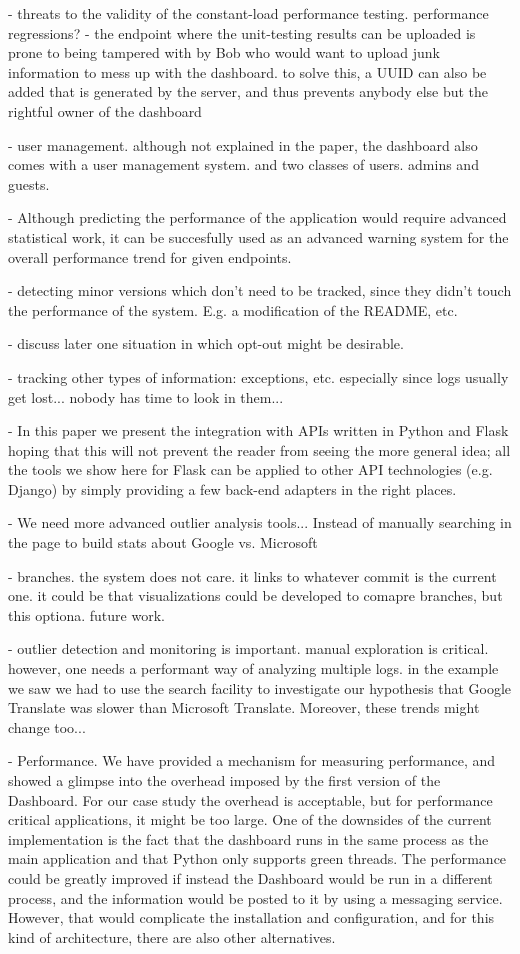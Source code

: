 - threats to the validity of the constant-load performance testing. performance regressions? 
- the endpoint where the unit-testing results can be uploaded is prone to being tampered with by Bob who would want to upload junk information to mess up with the dashboard. to solve this, a UUID can also be added that is generated by the server, and thus prevents anybody else but the rightful owner of the dashboard 

- user management. although not explained in the paper, the dashboard also comes with a user management system. and two classes of users. admins and guests.

- Although predicting the performance of the application would require advanced statistical work, it can be succesfully used as an advanced warning system for the overall performance trend for given endpoints.

- detecting minor versions which don't need to be tracked, since they didn't touch the performance of the system. E.g. a modification of the README, etc. 

- discuss later one situation in which opt-out might be desirable. 

- tracking other types of information: exceptions, etc. especially since logs usually get lost... nobody has time to look in them...

-  In this paper we present the integration with APIs written in Python and Flask hoping that this will not prevent the reader from seeing the more general idea; all the tools we show here for Flask can be applied to other API technologies (e.g. Django) by simply providing a few back-end adapters in the right places.

- We need more advanced outlier analysis tools... Instead of manually searching in the page to build stats about Google vs. Microsoft

- branches. the system does not care. it links to whatever commit is the current one. it could be that visualizations could be developed to comapre branches, but this optiona. future work. 

- outlier detection and monitoring is important. manual exploration is critical. however, one needs a performant way of analyzing multiple logs. in the example we saw we had to use the search facility to investigate our hypothesis that Google Translate was slower than Microsoft Translate. Moreover, these trends might change too... 

- Performance. We have provided a mechanism for measuring performance, and showed a glimpse into the overhead imposed by the first version of the Dashboard. For our case study the overhead is acceptable, but for performance critical applications, it might be too large. One of the downsides of the current implementation is the fact that the dashboard runs in the same process as the main application and that Python only supports green threads. The performance could be greatly improved if instead the Dashboard would be run in a different process, and the information would be posted to it by using a messaging service. However, that would complicate the installation and configuration, and for this kind of architecture, there are also other alternatives.

